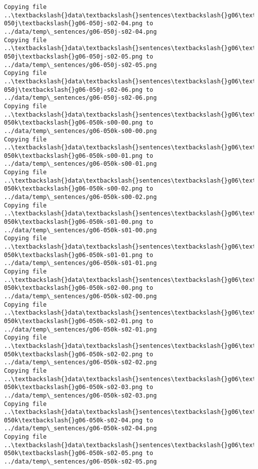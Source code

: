 \documentclass[11pt]{article}
\begin{document}
\begin{Verbatim}[commandchars=\\\{\}]
Copying file ..\textbackslash{}data\textbackslash{}sentences\textbackslash{}g06\textbackslash{}g06-050j\textbackslash{}g06-050j-s02-04.png to
../data/temp\_sentences/g06-050j-s02-04.png
Copying file ..\textbackslash{}data\textbackslash{}sentences\textbackslash{}g06\textbackslash{}g06-050j\textbackslash{}g06-050j-s02-05.png to
../data/temp\_sentences/g06-050j-s02-05.png
Copying file ..\textbackslash{}data\textbackslash{}sentences\textbackslash{}g06\textbackslash{}g06-050j\textbackslash{}g06-050j-s02-06.png to
../data/temp\_sentences/g06-050j-s02-06.png
Copying file ..\textbackslash{}data\textbackslash{}sentences\textbackslash{}g06\textbackslash{}g06-050k\textbackslash{}g06-050k-s00-00.png to
../data/temp\_sentences/g06-050k-s00-00.png
Copying file ..\textbackslash{}data\textbackslash{}sentences\textbackslash{}g06\textbackslash{}g06-050k\textbackslash{}g06-050k-s00-01.png to
../data/temp\_sentences/g06-050k-s00-01.png
Copying file ..\textbackslash{}data\textbackslash{}sentences\textbackslash{}g06\textbackslash{}g06-050k\textbackslash{}g06-050k-s00-02.png to
../data/temp\_sentences/g06-050k-s00-02.png
Copying file ..\textbackslash{}data\textbackslash{}sentences\textbackslash{}g06\textbackslash{}g06-050k\textbackslash{}g06-050k-s01-00.png to
../data/temp\_sentences/g06-050k-s01-00.png
Copying file ..\textbackslash{}data\textbackslash{}sentences\textbackslash{}g06\textbackslash{}g06-050k\textbackslash{}g06-050k-s01-01.png to
../data/temp\_sentences/g06-050k-s01-01.png
Copying file ..\textbackslash{}data\textbackslash{}sentences\textbackslash{}g06\textbackslash{}g06-050k\textbackslash{}g06-050k-s02-00.png to
../data/temp\_sentences/g06-050k-s02-00.png
Copying file ..\textbackslash{}data\textbackslash{}sentences\textbackslash{}g06\textbackslash{}g06-050k\textbackslash{}g06-050k-s02-01.png to
../data/temp\_sentences/g06-050k-s02-01.png
Copying file ..\textbackslash{}data\textbackslash{}sentences\textbackslash{}g06\textbackslash{}g06-050k\textbackslash{}g06-050k-s02-02.png to
../data/temp\_sentences/g06-050k-s02-02.png
Copying file ..\textbackslash{}data\textbackslash{}sentences\textbackslash{}g06\textbackslash{}g06-050k\textbackslash{}g06-050k-s02-03.png to
../data/temp\_sentences/g06-050k-s02-03.png
Copying file ..\textbackslash{}data\textbackslash{}sentences\textbackslash{}g06\textbackslash{}g06-050k\textbackslash{}g06-050k-s02-04.png to
../data/temp\_sentences/g06-050k-s02-04.png
Copying file ..\textbackslash{}data\textbackslash{}sentences\textbackslash{}g06\textbackslash{}g06-050k\textbackslash{}g06-050k-s02-05.png to
../data/temp\_sentences/g06-050k-s02-05.png

\end{Verbatim}
\end{document}
